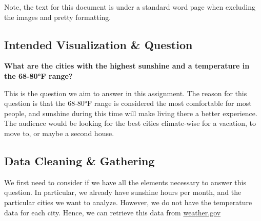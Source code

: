 \documentclass{article}
\begin{document}
\newpage
Note, the text for this document is under a standard word page when excluding the images and pretty formatting. 

\subsection{Intended Visualization \& Question}

\textbf{What are the cities with the highest sunshine and a temperature in the 68-80°F range?}

This is the question we aim to answer in this assignment.
The reason for this question is that the 68-80°F range is considered the most comfortable for most people, 
and sunshine during this time will make living there a better experience. 
The audience would be looking for the best cities climate-wise for a vacation, to move to, or maybe a second house.

\subsection{Data Cleaning \& Gathering}

We first need to consider if we have all the elements necessary to answer this question.
In particular, we already have sunshine hours per month, and the particular cities we want to analyze.
However, we do not have the temperature data for each city. Hence, we can retrieve this data from \href{https://www.weather.gov/wrh/Climate}{weather.gov} 
\end{document}
